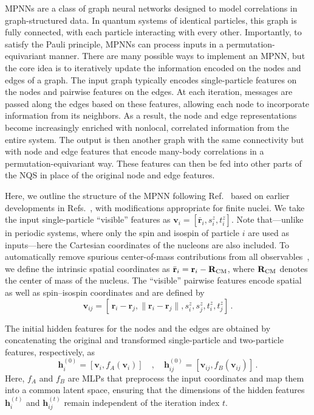 MPNNs are a class of graph neural networks designed to model correlations in graph-structured data. In quantum systems of identical particles, this graph is fully connected, with each particle interacting with every other.
Importantly, to satisfy the Pauli principle, MPNNs can process inputs in a permutation-equivariant manner.
There are many possible ways to implement an MPNN, but the core idea is to iteratively update the information encoded on the nodes and edges of a graph.
The input graph typically encodes single-particle features on the nodes and pairwise features on the edges.
At each iteration, messages are passed along the edges based on these features, allowing each node to incorporate information from its neighbors.
As a result, the node and edge representations become increasingly enriched with nonlocal, correlated information from the entire system.
The output is then another graph with the same connectivity but with node and edge features that encode many-body correlations in a permutation-equivariant way.
These features can then be fed into other parts of the NQS in place of the original node and edge features.


Here, we outline the structure of the MPNN following Ref.~\cite{fore_investigating_2024} based on earlier developments in Refs.~\cite{pescia_message-passing_2024,kim_neural-network_2024}, with modifications appropriate for finite nuclei.
We take the input single-particle ``visible'' features as \( \mathbf{v}_i = [\bar{\mathbf{r}}_i, s_i^z, t_i^z ] \). Note that—unlike in periodic systems, where only the spin and isospin of particle \( i \) are used as inputs—here the Cartesian coordinates of the nucleons are also included. To automatically remove spurious center-of-mass contributions from all observables~\cite{massella_exact_2020}, we define the intrinsic spatial coordinates as \( \bar{\mathbf{r}}_i = \mathbf{r}_i - \mathbf{R}_{\rm CM} \), where \( \mathbf{R}_{\rm CM} \) denotes the center of mass of the nucleus. The ``visible'' pairwise features encode spatial as well as spin–isospin coordinates and are defined by  
\[
\mathbf{v}_{ij} = [ \,\mathbf{r}_i-\mathbf{r}_j, \| \mathbf{r}_i - \mathbf{r}_j \|, s_i^z, s_j^z, t_i^z, t_j^z] \, .
\]

The initial hidden features for the nodes and the edges are obtained by concatenating the original and transformed single-particle and two-particle features, respectively, as
\begin{equation*}
\mathbf{h}_i^{(0)} = [\mathbf{v}_i, f_A(\mathbf{v}_i)] \quad , \quad
\mathbf{h}_{ij}^{(0)} = [\mathbf{v}_{ij}, f_B(\mathbf{v}_{ij})] \, .
\end{equation*}
Here, \( f_A \) and \( f_B \) are MLPs that preprocess the input coordinates and map them into a common latent space, ensuring that the dimensions of the hidden features \( \mathbf{h}_i^{(t)} \) and \( \mathbf{h}_{ij}^{(t)} \) remain independent of the iteration index \( t \).

